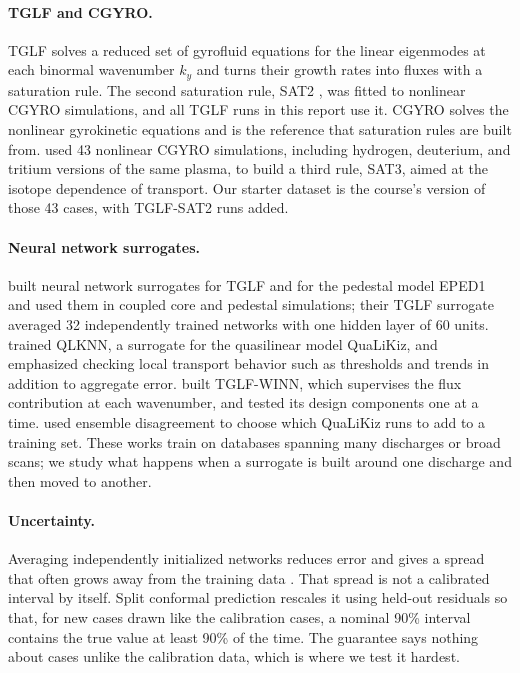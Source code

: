 \documentclass[12pt,letterpaper]{article}
\begin{document}
\paragraph{TGLF and CGYRO.} TGLF \citep{staebler2007} solves a reduced set of
gyrofluid equations for the linear eigenmodes at each binormal wavenumber $k_y$ and turns
their growth rates into fluxes with a saturation rule. The second saturation rule, SAT2
\citep{staebler2021}, was fitted to nonlinear CGYRO simulations, and all TGLF runs in this
report use it. CGYRO \citep{candy2016} solves the nonlinear gyrokinetic equations and is
the reference that saturation rules are built from. \citet{dudding2022} used 43 nonlinear
CGYRO simulations, including hydrogen, deuterium, and tritium versions of the same plasma,
to build a third rule, SAT3, aimed at the isotope dependence of transport. Our starter
dataset is the course's version of those 43 cases, with TGLF-SAT2 runs added.

\paragraph{Neural network surrogates.} \citet{meneghini2017} built neural network
surrogates for TGLF and for the pedestal model EPED1 and used them in coupled core and
pedestal simulations; their TGLF surrogate averaged 32 independently trained networks with
one hidden layer of 60 units. \citet{vandeplassche2020} trained QLKNN, a surrogate for the
quasilinear model QuaLiKiz, and emphasized checking local transport behavior such as
thresholds and trends in addition to aggregate error. \citet{cao2026} built TGLF-WINN,
which supervises the flux contribution at each wavenumber, and tested its design
components one at a time. \citet{zanisi2024} used ensemble disagreement to choose which
QuaLiKiz runs to add to a training set. These works train on databases spanning many
discharges or broad scans; we study what happens when a surrogate is built around one
discharge and then moved to another.

\paragraph{Uncertainty.} Averaging independently initialized networks reduces error
and gives a spread that often grows away from the training data
\citep{lakshminarayanan2017}. That spread is not a calibrated interval by itself. Split
conformal prediction \citep{lei2018} rescales it using held-out residuals so that, for new
cases drawn like the calibration cases, a nominal 90\% interval contains the true value at
least 90\% of the time. The guarantee says nothing about cases unlike the calibration
data, which is where we test it hardest.
\end{document}
